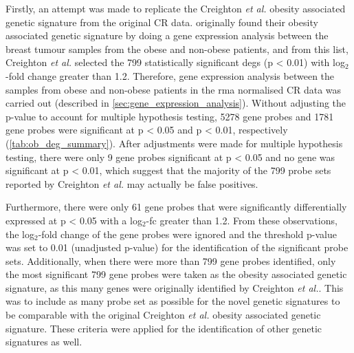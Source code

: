 Firstly, an attempt was made to replicate the Creighton \textit{et al.} obesity associated genetic signature from the original CR data.
\citet{Creighton2012} originally found their obesity associated genetic signature by doing a gene expression analysis between the breast tumour samples from the obese and non-obese patients, and from this list, Creighton \textit{et al.} selected the 799 statistically significant \glspl{deg} (p \textless{} 0.01) with log$_2$-fold change greater than 1.2.
Therefore, gene expression analysis  between the samples from obese and non-obese patients in the \gls{rma} normalised CR data was carried out (described in \cref{sec:gene_expression_analysis}).
Without adjusting the p-value to account for multiple hypothesis testing, 5278 gene probes and 1781 gene probes were significant at p \textless{} 0.05 and p \textless{} 0.01, respectively (\cref{tab:ob_deg_summary}).
After adjustments were made for multiple hypothesis testing, there were only 9 gene probes significant at p \textless{} 0.05 and no gene was significant at p \textless{} 0.01, which suggest that the majority of the 799 probe sets reported by Creighton \textit{et al.} may actually be false positives.

Furthermore, there were only 61 gene probes that were significantly differentially expressed at p \textless{} 0.05 with a log$_2$-\gls{fc} greater than 1.2.
From these observations, the log$_2$-fold change of the gene probes were ignored and the threshold p-value was set to 0.01 (unadjusted p-value) for the identification of the significant probe sets.
Additionally, when there were more than 799 gene probes identified, only the most significant 799 gene probes were taken as the obesity associated genetic signature, as this many genes were originally identified by Creighton \textit{et al.}.
This was to include as many probe set as possible for the novel genetic signatures to be comparable with the original Creighton \textit{et al.} obesity associated genetic signature.
These criteria were applied for the identification of other genetic signatures as well.


